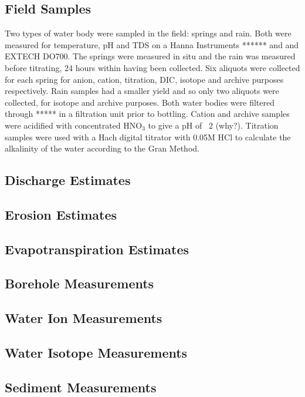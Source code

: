 \documentclass[hidelinks, 12pt]{article} %
\begin{document}
\subsection{Field Samples}
Two types of water body were sampled in the field: springs and rain. Both were measured for temperature, pH and TDS on a Hanna Instruments ****** and  and EXTECH DO700. The springs were measured in situ and the rain was measured before titrating, 24 hours within having been collected. Six aliquots were collected for each spring for anion, cation, titration, DIC, isotope and archive purposes respectively. Rain samples had a smaller yield and so only two aliquots were collected, for isotope and archive purposes. Both water bodies were filtered through ***** in a filtration unit prior to bottling. Cation and archive samples were acidified with concentrated HNO$_3$ to give a pH of ~2 (why?). Titration samples were used with a Hach digital titrator with 0.05M HCl to calculate the alkalinity of the water according to the Gran Method.

\subsection{Discharge Estimates}

\subsection{Erosion Estimates}

\subsection{Evapotranspiration Estimates}

\subsection{Borehole Measurements}

\subsection{Water Ion Measurements}

\subsection{Water Isotope Measurements}

\subsection{Sediment Measurements}
\end{document}
